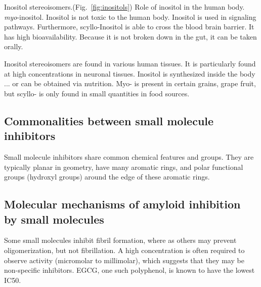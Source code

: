Inositol stereoisomers.(Fig.~\ref{fig:inositols}) Role of inositol in the human body. \emph{myo}-inositol.  
Inositol is not toxic to the human body.  Inositol is used in signaling pathways. Furthermore, scyllo-Inositol is able to cross the blood brain barrier. It has high bioavailability. Because it is not broken down in the gut, it can be taken orally.

Inositol stereoisomers are found in various human tissues. It is particularly found at high concentrations in neuronal tissues. Inositol is synthesized inside the body ... or can be obtained via nutrition.  Myo- is present in certain grains, grape fruit, but scyllo- is only found in small quantities in food sources.
	
		
			

\subsection{Commonalities between small molecule inhibitors}
Small molecule inhibitors share common chemical features and groups.  They are typically planar in geometry, have many aromatic rings, and polar functional groups (hydroxyl groups) around the edge of these aromatic rings.



\subsection{Molecular mechanisms of amyloid inhibition 
	            \\ by small molecules}
Some small molecules inhibit fibril formation, where as others may prevent oligomerization, but not fibrillation. A high concentration is often required to observe activity (micromolar to millimolar), which suggests that they may be non-specific inhibitors. EGCG, one such polyphenol, is known to have the lowest IC50.
      
